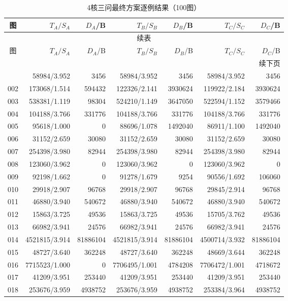 \begin{longtable}{crrrrrr}
\caption{4核三问最终方案逐例结果（100图）}\label{tab:v7-detail-4}\\
\toprule
图 & $T_A/S_A$ & $D_A$/B & $T_B/S_B$ & $D_B$/B & $T_C/S_C$ & $D_C$/B \\
\midrule
\endfirsthead
\multicolumn{7}{c}{续表}\\
\toprule
图 & $T_A/S_A$ & $D_A$/B & $T_B/S_B$ & $D_B$/B & $T_C/S_C$ & $D_C$/B \\
\midrule
\endhead
\midrule\multicolumn{7}{r}{续下页}\\
\endfoot
\bottomrule
\endlastfoot
001 & 58984/3.952 & 3456 & 58984/3.952 & 3456 & 58984/3.952 & 3456 \\
002 & 173068/1.514 & 594432 & 122326/2.141 & 3930624 & 119922/2.184 & 3930624 \\
003 & 538381/1.119 & 98304 & 524210/1.149 & 3647050 & 522594/1.152 & 3579466 \\
004 & 104188/3.766 & 331776 & 104188/3.766 & 331776 & 104188/3.766 & 331776 \\
005 & 95618/1.000 & 0 & 88696/1.078 & 1492040 & 86911/1.100 & 1492040 \\
006 & 31152/2.659 & 30080 & 31152/2.659 & 30080 & 31152/2.659 & 30080 \\
007 & 254398/3.980 & 82944 & 254398/3.980 & 82944 & 254398/3.980 & 82944 \\
008 & 123060/3.962 & 0 & 123060/3.962 & 0 & 123060/3.962 & 0 \\
009 & 92198/1.662 & 0 & 91278/1.679 & 9254 & 90556/1.692 & 106060 \\
010 & 29918/2.907 & 96768 & 29918/2.907 & 96768 & 29845/2.914 & 96768 \\
011 & 46880/3.940 & 540672 & 46880/3.940 & 540672 & 46880/3.940 & 540672 \\
012 & 15863/3.725 & 49536 & 15863/3.725 & 49536 & 15705/3.762 & 49536 \\
013 & 66982/3.941 & 24576 & 66982/3.941 & 24576 & 66982/3.941 & 24576 \\
014 & 4521815/3.914 & 81886104 & 4521815/3.914 & 81886104 & 4500714/3.932 & 81886104 \\
015 & 48727/3.640 & 362248 & 48727/3.640 & 362248 & 48669/3.644 & 362248 \\
016 & 7715523/1.000 & 0 & 7706495/1.001 & 4784208 & 7706472/1.001 & 4718672 \\
017 & 41209/3.951 & 253440 & 41209/3.951 & 253440 & 41209/3.951 & 253440 \\
018 & 253676/3.959 & 4938752 & 253676/3.959 & 4938752 & 253384/3.964 & 4938752 \\

\end{longtable}
